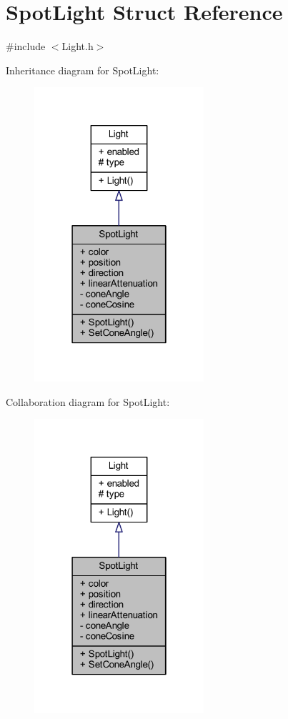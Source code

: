 \hypertarget{struct_spot_light}{}\section{Spot\+Light Struct Reference}
\label{struct_spot_light}


{\ttfamily \#include $<$Light.\+h$>$}



Inheritance diagram for Spot\+Light\+:\nopagebreak
\begin{figure}[H]
\begin{center}
\leavevmode
\includegraphics[width=178pt]{struct_spot_light__inherit__graph}
\end{center}
\end{figure}


Collaboration diagram for Spot\+Light\+:\nopagebreak
\begin{figure}[H]
\begin{center}
\leavevmode
\includegraphics[width=178pt]{struct_spot_light__coll__graph}
\end{center}
\end{figure}
